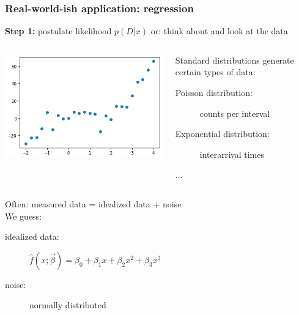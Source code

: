 \documentclass[t,aspectratio=169]{beamer}
\begin{document}
\begin{frame}
  \frametitle{Real-world-ish application: regression}
  \textbf{Step 1:} postulate likelihood $p(D|x)$ or: think about and look at the data
  \begin{columns}
    \begin{column}[T]{0.35\textwidth}
      {\centering
        \includegraphics[width=\textwidth]{images/polyfit_data.png}
      }
    \end{column}
    \begin{column}[T]{0.6\textwidth}
      Standard distributions generate certain types of data:
      \begin{description}
      \item[Poisson distribution:] counts per interval
      \item[Exponential distribution:] interarrival times
      \item[...]
      \end{description}
    \end{column}
  \end{columns}
  Often: measured data = idealized data + noise\\
  \bigskip
  We guess: 
  \begin{description}
  \item[idealized data:] $\hat f(x; \vec{\beta})=\beta_0 + \beta_1x + \beta_2x^2 + \beta_3x^3$
  \item[\phantom{zed data}noise:] normally distributed
  \end{description}
\end{frame}
\end{document}
